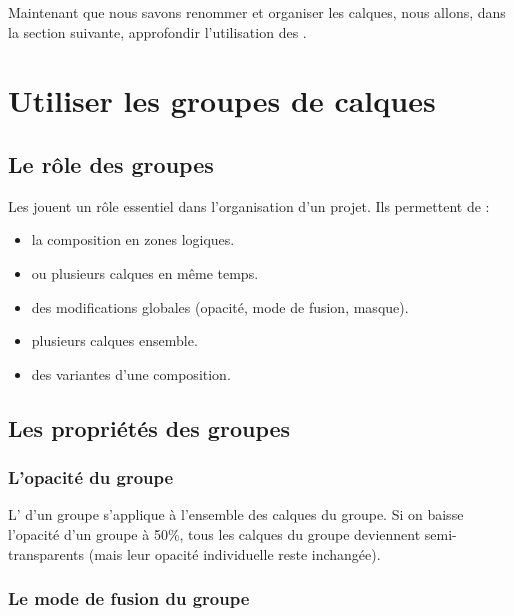 Maintenant que nous savons renommer et organiser les calques, nous allons, dans la section suivante, approfondir l'utilisation des .

\section{Utiliser les groupes de calques}

\subsection{Le rôle des groupes}

Les  jouent un rôle essentiel dans l'organisation d'un projet. Ils permettent de :

\begin{itemize}
    \item {} la composition en zones logiques.
    \item {} ou  plusieurs calques en même temps.
    \item {} des modifications globales (opacité, mode de fusion, masque).
    \item {} plusieurs calques ensemble.
    \item {} des variantes d'une composition.
\end{itemize}

\subsection{Les propriétés des groupes}

\subsubsection{L'opacité du groupe}

L' d'un groupe s'applique à l'ensemble des calques du groupe. Si on baisse l'opacité d'un groupe à 50\%, tous les calques du groupe deviennent semi-transparents (mais leur opacité individuelle reste inchangée).

\subsubsection{Le mode de fusion du groupe}

